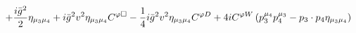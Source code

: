 %
\begin{dmath*}
%
  +  \frac{i {\bar g}{}^2}{2}\eta_{\mu_3 \mu_4}  +  i {\bar g}{}^2 v^2\eta_{\mu_3 \mu_4} C^{ \varphi  \Box}  -  \frac{1}{4} i {\bar g}{}^2 v^2\eta_{\mu_3 \mu_4} C^{ \varphi  D}  +  4 iC^{ \varphi  W} \left(p_3^{\mu_4} p_4^{\mu_3} - p_{3}\nobreak\cdot\nobreak{}p_{4} \eta_{\mu_3 \mu_4}\right)
%
\end{dmath*}
%
